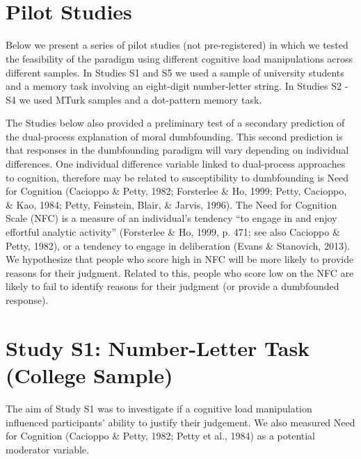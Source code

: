 \documentclass[
  man,floatsintext]{apa6}
\begin{document}
~

\newpage

~

\newpage

\hypertarget{pilot-studies}{%
\section{Pilot Studies}\label{pilot-studies}}

Below we present a series of pilot studies (not pre-registered) in which we tested the feasibility of the paradigm using different cognitive load manipulations across different samples. In Studies S1 and S5 we used a sample of university students and a memory task involving an eight-digit number-letter string. In Studies S2 - S4 we used MTurk samples and a dot-pattern memory task.

The Studies below also provided a preliminary test of a secondary prediction of the dual-process explanation of moral dumbfounding. This second prediction is that responses in the dumbfounding paradigm will vary depending on individual differences. One individual difference variable linked to dual-process approaches to cognition, therefore may be related to susceptibility to dumbfounding is Need for Cognition (Cacioppo \& Petty, 1982; Forsterlee \& Ho, 1999; Petty, Cacioppo, \& Kao, 1984; Petty, Feinstein, Blair, \& Jarvis, 1996). The Need for Cognition Scale (NFC) is a measure of an individual's tendency ``to engage in and enjoy effortful analytic activity'' (Forsterlee \& Ho, 1999, p. 471; see also Cacioppo \& Petty, 1982), or a tendency to engage in deliberation (Evans \& Stanovich, 2013). We hypothesize that people who score high in NFC will be more likely to provide reasons for their judgment. Related to this, people who score low on the NFC are likely to fail to identify reasons for their judgment (or provide a dumbfounded response).

\newpage

\hypertarget{study-s1-number-letter-task-college-sample}{%
\section{Study S1: Number-Letter Task (College Sample)}\label{study-s1-number-letter-task-college-sample}}

The aim of Study S1 was to investigate if a cognitive load manipulation influenced participants' ability to justify their judgement. We also measured Need for Cognition (Cacioppo \& Petty, 1982; Petty et al., 1984) as a potential moderator variable.
\end{document}
